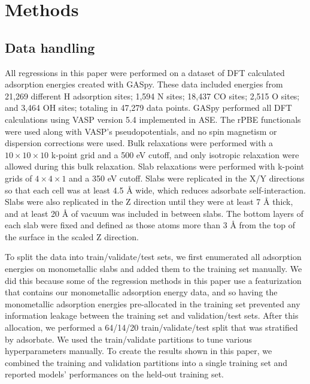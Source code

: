 \documentclass[]{achemso}
\begin{document}

\section{Methods}

\subsection{Data handling}

All regressions in this paper were performed on a dataset of \gls{DFT} calculated adsorption energies created with \gls{GASpy}\cite{Tran2018, Tran2018a}.
These data included energies from 21,269 different H adsorption sites; 1,594 N sites; 18,437 CO sites; 2,515 O sites; and 3,464 OH sites; totaling in 47,279 data points.
\gls{GASpy} performed all \gls{DFT} calculations using \gls{VASP}\cite{Kresse1993, Kresse1994, Kresse1996, Kresse1996a} version 5.4 implemented in \gls{ASE}\cite{HjorthLarsen2017}.
The \gls{rPBE} functionals\cite{Hammer1999} were used along with \gls{VASP}'s pseudopotentials, and no spin magnetism or dispersion corrections were used.
Bulk relaxations were performed with a $10\times10\times10$ k-point grid and a 500 eV cutoff, and only isotropic relaxation were allowed during this bulk relaxation.
Slab relaxations were performed with k-point grids of $4\times4\times1$ and a 350 eV cutoff.
Slabs were replicated in the X/Y directions so that each cell was at least 4.5 \AA{} wide, which reduces adsorbate self-interaction.
Slabs were also replicated in the Z direction until they were at least 7 \AA{} thick, and at least 20 \AA{} of vacuum was included in between slabs.
The bottom layers of each slab were fixed and defined as those atoms more than 3 \AA{} from the top of the surface in the scaled Z direction.

To split the data into train/validate/test sets, we first enumerated all adsorption energies on monometallic slabs and added them to the training set manually. 
We did this because some of the regression methods in this paper use a featurization that contains our monometallic adsorption energy data\cite{Tran2018}, and so having the monometallic adsorption energies pre-allocated in the training set prevented any information leakage between the training set and validation/test sets.
After this allocation, we performed a 64/14/20 train/validate/test split that was stratified\cite{Thompson2012} by adsorbate.
We used the train/validate partitions to tune various hyperparameters manually.
To create the results shown in this paper, we combined the training and validation partitions into a single training set and reported models' performances on the held-out training set.
\end{document}

